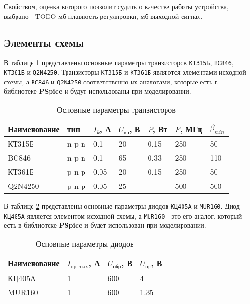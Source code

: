 Свойством, оценка которого позволит судить о качестве работы устройства, выбрано - TODO мб плавность регулировки, мб выходной сигнал. %

\subsection{Элементы схемы}

В таблице \ref{tab:transistors} представлены основные параметры транзисторов \verb+КТ315Б+, \verb+BC846+, \verb+КТ361Б+ и \verb+Q2N4250+. Транзисторы \verb+КТ315Б+ и \verb+КТ361Б+ являются элементами исходной схемы, а \verb+BC846+ и \verb+Q2N4250+ соответственно их аналогами, которые есть в библиотеке \textbf{PSpice} и будут использованы при моделировании.

\begin{table}[H]
\begin{center}
	\caption{Основные параметры транзисторов}
	\label{tab:transistors}
	\def\tabcolsep{10pt}
	\begin{tabular}{|l|l|l|l|l|l|l|}
		\hline
		Наименование &
		тип & 
		$I_k$, А &
		$U_\text{кэ}$, В & 
		$P$, Вт & 
		$F$, МГц & 
		$\beta_{min}$ \\ 
		\hline
		КТ315Б &
		n-p-n &
		0.1 &
		20 &
		0.15 &
		250 &
		50 \\
		\hline
		BC846 &
		n-p-n &
		0.1 &
		65 &
		0.33 &
		250 &
		110 \\
		\hline
		КТ361Б &
		p-n-p &
		0.05 &
		20 &
		0.15 &
		250 &
		50 \\
		\hline
		Q2N4250 &
		p-n-p  &
		0.05 &
		25 &
		&
		500 &
		500 \\ 
		\hline
\end{tabular}
\end{center}
\end{table}

В таблице \ref{tab:diods} представлены основные параметры диодов \verb+КЦ405А+ и \verb+MUR160+. Диод \verb+КЦ405А+ является элементом исходной схемы, а \verb+MUR160+ - это его аналог, который есть в библиотеке \textbf{PSpice} и будет использован при моделировании.

\begin{table}[H]
\begin{center}
	\caption{Основные параметры диодов}
	\label{tab:diods}
	\def\tabcolsep{10pt}
	\begin{tabular}{|l|l|l|l|}
		\hline
		Наименование &
		$I_\text{пр max}$, А &
		$U_\text{обр}$, В &
		$U_\text{пр}$, В \\ 
		\hline
		КЦ405А &
		1 &
		600 &
		4 \\
		\hline
		MUR160 &
		1 &
		600 &
		1.35 \\
		\hline
\end{tabular}
\end{center}
\end{table}

